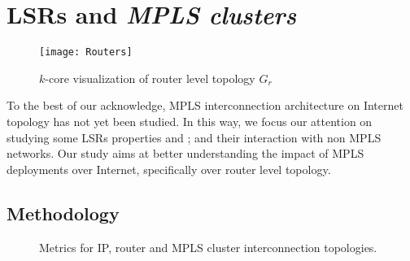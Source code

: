 \section{LSRs and \textit{MPLS clusters}}\label{cluster}
\begin{figure}[!t]
  \begin{center}
    \texttt{[image: Routers]}
  \end{center}
  \caption{$k$-core visualization of router level topology $G_{r}$ }
  \label{fig_k_core_routers}
\end{figure}

To the best of our acknowledge, MPLS interconnection architecture on Internet
topology has not yet been studied. In this way, we focus our attention on
studying some LSRs properties and ; and their interaction
with non MPLS networks. Our study aims at better understanding the impact of
MPLS deployments over Internet, specifically over router level topology.

\subsection{Methodology}\label{cluster.methodo}
\begin{figure*}[!htb]
  \begin{center}
    \hfil
    \hfil
  \end{center}
\caption{Metrics for IP, router and MPLS cluster interconnection
topologies.} 
\label{fig_metrics}        
\end{figure*}

